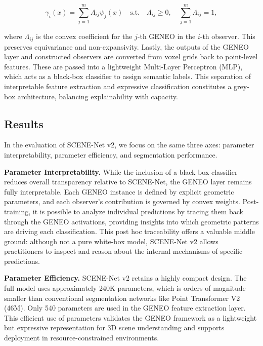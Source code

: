 \begin{equation}
      \gamma_i(x) = \sum_{j=1}^m \Lambda_{ij} \psi_j(x) \quad \text{s.t.} \quad \Lambda_{ij} \geq 0, \quad \sum_{j=1}^m \Lambda_{ij} = 1,
\end{equation}

where $\Lambda_{ij}$ is the convex coefficient for the $j$-th GENEO in the
$i$-th observer. This preserves equivariance and non-expansivity.
%
Lastly, the outputs of the GENEO layer and constructed observers are converted
from voxel grids back to point-level features. These are passed into a
lightweight Multi-Layer Perceptron (MLP), which acts as a black-box classifier
to assign semantic labels. This separation of interpretable feature extraction
and expressive classification constitutes a grey-box architecture, balancing
explainability with capacity.

\subsection{Results}

In the evaluation of SCENE-Net v2, we focus on the same three axes: parameter
interpretability, parameter efficiency, and segmentation performance.

\textbf{Parameter Interpretability.} \;
While the inclusion of a black-box classifier reduces overall transparency
relative to SCENE-Net, the GENEO layer remains fully interpretable. Each
GENEO instance is defined by explicit geometric parameters, and each observer's
contribution is governed by convex weights. Post-training, it is possible to
analyze individual predictions by tracing them back through the GENEO
activations, providing insights into which geometric patterns are driving each
classification. This post hoc traceability offers a valuable middle ground:
although not a pure white-box model, SCENE-Net v2 allows practitioners to
inspect and reason about the internal mechanisms of specific predictions.

\textbf{Parameter Efficiency.} \;
SCENE-Net v2 retains a highly compact design. The full model uses approximately
240K parameters, which is orders of magnitude smaller than conventional
segmentation networks like Point Transformer V2 (46M). Only 540 parameters are
used in the GENEO feature extraction layer. This efficient use of parameters
validates the GENEO framework as a lightweight but expressive representation
for 3D scene understanding and supports deployment in resource-constrained
environments.

